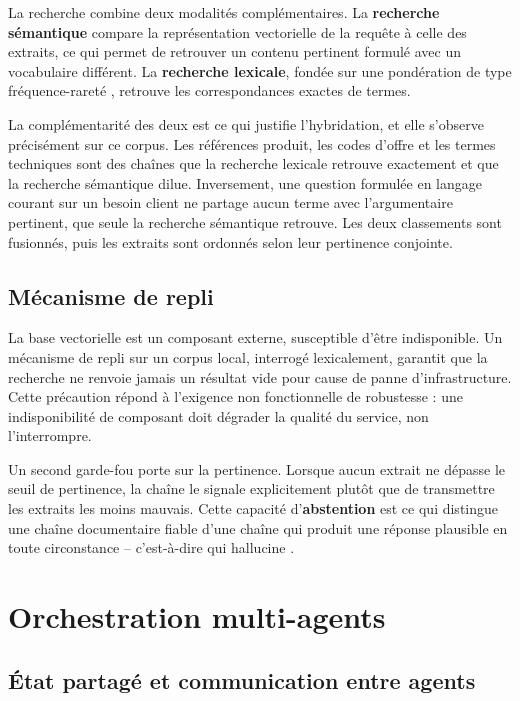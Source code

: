 La recherche combine deux modalités complémentaires. La \textbf{recherche sémantique} compare la représentation vectorielle de la requête à celle des extraits, ce qui permet de retrouver un contenu pertinent formulé avec un vocabulaire différent. La \textbf{recherche lexicale}, fondée sur une pondération de type fréquence-rareté \cite{robertson2009bm25}, retrouve les correspondances exactes de termes.

La complémentarité des deux est ce qui justifie l'hybridation, et elle s'observe précisément sur ce corpus. Les références produit, les codes d'offre et les termes techniques sont des chaînes que la recherche lexicale retrouve exactement et que la recherche sémantique dilue. Inversement, une question formulée en langage courant sur un besoin client ne partage aucun terme avec l'argumentaire pertinent, que seule la recherche sémantique retrouve. Les deux classements sont fusionnés, puis les extraits sont ordonnés selon leur pertinence conjointe.

\subsection{Mécanisme de repli}

La base vectorielle est un composant externe, susceptible d'être indisponible. Un mécanisme de repli sur un corpus local, interrogé lexicalement, garantit que la recherche ne renvoie jamais un résultat vide pour cause de panne d'infrastructure. Cette précaution répond à l'exigence non fonctionnelle de robustesse : une indisponibilité de composant doit dégrader la qualité du service, non l'interrompre.

Un second garde-fou porte sur la pertinence. Lorsque aucun extrait ne dépasse le seuil de pertinence, la chaîne le signale explicitement plutôt que de transmettre les extraits les moins mauvais. Cette capacité d'\textbf{abstention} est ce qui distingue une chaîne documentaire fiable d'une chaîne qui produit une réponse plausible en toute circonstance -- c'est-à-dire qui hallucine \cite{ji2023hallucination}.

\section{Orchestration multi-agents}
\label{sec:orchestration}

\subsection{État partagé et communication entre agents}

